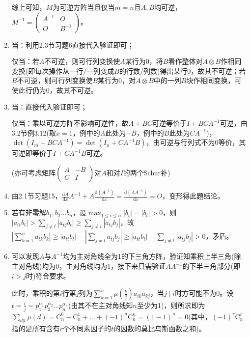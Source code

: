 \documentclass[a4paper,UTF8,fontset=windows]{ctexart}
\begin{document}
\begin{enumerate}
综上可知，$M$为可逆方阵当且仅当$m=n$且$A,B$均可逆，$M^{-1}=\begin{pmatrix}A^{-1}&O\\O&B^{-1}\end{pmatrix}$。

\item
当：利用2.3节习题6直接代入验证即可；

仅当：若$A$不可逆，则可行列变换使$A$某行为0，将$B$看作整体对$A\otimes B$作相同变换(即每次操作从一行/一列变成$B$的行数/列数)得出某行0，故其不可逆；若$B$不可逆，则可行列变换使$B$某行为0，对$A\otimes B$中的一列$B$块作相同变换，可使此行仍为0，故其不可逆。

\item
当：直接代入验证即可；

仅当：乘以可逆方阵不影响可逆性，故$A+BC$可逆等价于$I+BCA^{-1}$可逆，由3.2节例3.12(取$x=1$，例中的$A$此处为$-B$，例中的$B$此处为$CA^{-1}$)，$\det(I_m+BCA^{-1})=\det(I_n+CA^{-1}B)$，由可逆与行列式不为0等价，其可逆即等价于$I+CA^{-1}B$可逆。

(亦可考虑矩阵$\begin{pmatrix}A&-B\\C&I\end{pmatrix}$对$A$和对$I$的两个Schur补)

\item
由2.1节习题15，$ \frac{\mathrm{d}A}{\mathrm{d}x}A^{-1}+A\frac{\mathrm{d}(A^{-1})}{\mathrm{d}x}=\frac{\mathrm{d}(AA^{-1})}{\mathrm{d}x}=O$，变形得此题结论。

\item
若有非零解$b_1,b_2\dots b_n$，设$\max_{1\le i\le n}{|b_i|}=|b_t|>0$，则$|a_{tt}b_t|>\sum_{j\ne t}|a_{tj}b_t|\ge\sum_{j\ne t}|a_{tj}b_j|$，故$\left|\sum_{k=1}^{n}{a_{tk}b_k}\right|\ge|a_{tt}b_t|-\left|\sum_{j\ne t}{a_{tj}b_j}\right|\ge|a_{tt}b_t|-\sum_{j\ne t}|a_{tj}b_j|>0$，矛盾。

\item
可以发现$A$与$A^{-1}$均为主对角线全为1的下三角方阵，验证知乘积上半三角(除主对角线)均为0，主对角线均为1，接下来只需验证$AA^{-1}$的下半三角部分(即$i>j$时)符合要求。

此时，乘积的第$i$行第$j$列为$\sum_{k=1}^{n}{\mu\left(\frac{k}{j}\right)a_{ik}a_{kj}}$，当$j\mid i$时方可能不为0。设$t=\frac{i}{j}=p_1^{\alpha_1}p_2^{\alpha_2}\dots p_n^{\alpha_n}$(由其不在主对角线知$n$至少为1)，则所求即为$\sum_{d|t}\mu(d)=\mathrm{C}_n^0-\mathrm{C}_n^1+\dots+(-1)^n\mathrm{C}_n^n=(1-1)^n=0$(其中，$(-1)^r\mathrm{C}_n^r$指的是所有含有$r$个不同素因子的$t$的因数的莫比乌斯函数之和)。


\end{enumerate}
\end{document}
